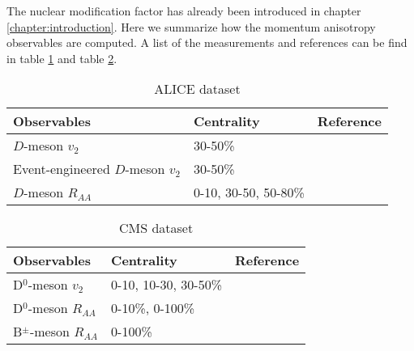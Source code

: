 The nuclear modification factor has already been introduced in chapter \ref{chapter:introduction}. 
Here we summarize how the momentum anisotropy observables are computed.
A list of the measurements and references can be find in table \ref{table:ALICE-obs} and table \ref{table:CMS-obs}.
\begin{center}
\begin{table}[h]
\caption{ALICE dataset}\label{table:ALICE-obs} 
\begin{tabularx}{\columnwidth}{XXX}
\hline 
 Observables & Centrality & Reference\\ 
\hline 
$D$-meson $v_2$ & 30-50\% & \cite{Acharya:2017qps}\\ 
\hline 
Event-engineered $D$-meson $v_2$ & 30-50\% & \cite{Grosa:2017zcz}\\ 
\hline 
$D$-meson $R_{AA}$ & 0-10, 30-50, 50-80\% & \cite{Acharya:2018hre}\\
\hline 
\end{tabularx}
\end{table}
\begin{table}[h]
\caption{CMS dataset}\label{table:CMS-obs} 
\begin{tabularx}{\columnwidth}{XXX}
\hline 
Observables & Centrality & Reference\\ 
\hline 
D${}^0$-meson $v_2$ & 0-10, 10-30, 30-50\% & \cite{Sirunyan:2017plt}\\ 
\hline 
D${}^0$-meson $R_{AA}$ & 0-10\%, 0-100\% & \cite{Sirunyan:2017xss}\\ 
\hline 
B${}^{\pm}$-meson $R_{AA}$ & 0-100\% & \cite{Sirunyan:2017oug}\\ 
\hline 
\end{tabularx}
\end{table}
\end{center}


